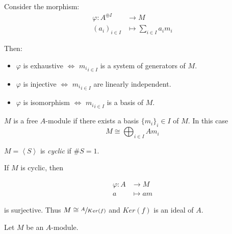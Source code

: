         \begin{rk}
            Consider the morphism:
            \begin{align*}
                \varphi: A^{\oplus{I}} &\longrightarrow M \\
                \left(a_i\right)_{i \in I} &\longmapsto \sum_{i\in I} a_i m_i
            \end{align*}

            Then:
            \begin{itemize}
                \item $\varphi$ is exhaustive $\Longleftrightarrow$ ${m_i}_{i\in I}$ is a system of generators of $M$.
                \item $\varphi$ is injective $\Longleftrightarrow$ ${m_i}_{i\in I}$ are linearly independent.
                \item $\varphi$ is isomorphism $\Longleftrightarrow$ ${m_i}_{i\in I}$ is a basis of $M$.
            \end{itemize}
        \end{rk}

        \begin{rk}
            $M$ is a free $A$-module if there exists a basis $\{m_i\}_i \in I$ of $M$.
            In this case
            \[
                M \cong \bigoplus_{i \in I} A m_i
            \]
        \end{rk}

        \begin{defn}
            $M = \left<S\right> $ is \emph{cyclic} if $\#S = 1$.
        \end{defn}

        \begin{rk}
            If $M$ is cyclic, then
            \begin{center}
            \begin{align*}
                \varphi: A &\longrightarrow M \\
                a &\longmapsto am
            \end{align*}
            \end{center}
            is surjective.
            Thus $M \cong \sfrac{A}{Ker(f)}$ and $Ker(f)$ is an ideal of $A$.
        \end{rk}

        \begin{theorem}
            Let $M$ be an $A$-module.
        \end{theorem}